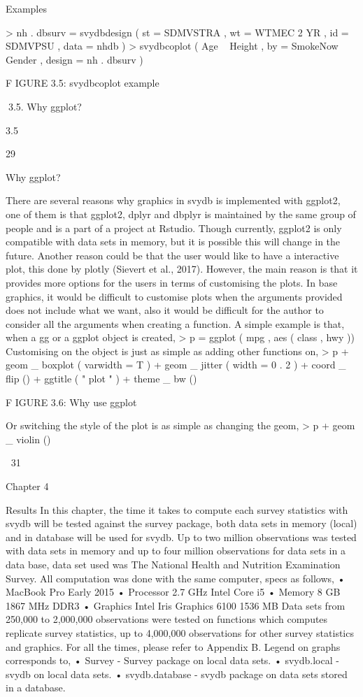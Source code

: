 Examples

> nh . dbsurv = svydbdesign ( st = SDMVSTRA , wt = WTMEC 2 YR ,
id = SDMVPSU , data = nhdb )
> svydbcoplot ( Age ~ Height , by = SmokeNow ~ Gender ,
design = nh . dbsurv )

F IGURE 3.5: svydbcoplot example

3.5. Why ggplot?

3.5

29

Why ggplot?

There are several reasons why graphics in svydb is implemented with ggplot2, one
of them is that ggplot2, dplyr and dbplyr is maintained by the same group of people
and is a part of a project at Rstudio. Though currently, ggplot2 is only compatible
with data sets in memory, but it is possible this will change in the future. Another
reason could be that the user would like to have a interactive plot, this done by
plotly (Sievert et al., 2017).
However, the main reason is that it provides more options for the users in terms
of customising the plots. In base graphics, it would be difficult to customise plots
when the arguments provided does not include what we want, also it would be difficult for the author to consider all the arguments when creating a function.
A simple example is that, when a gg or a ggplot object is created,
> p = ggplot ( mpg , aes ( class , hwy ))
Customising on the object is just as simple as adding other functions on,
> p + geom _ boxplot ( varwidth = T ) +
geom _ jitter ( width = 0 . 2 ) + coord _ flip () +
ggtitle ( " plot " ) + theme _ bw ()

F IGURE 3.6: Why use ggplot

Or switching the style of the plot is as simple as changing the geom,
> p + geom _ violin ()

31

Chapter 4

Results
In this chapter, the time it takes to compute each survey statistics with svydb will be
tested against the survey package, both data sets in memory (local) and in database
will be used for svydb. Up to two million observations was tested with data sets
in memory and up to four million observations for data sets in a data base, data set
used was The National Health and Nutrition Examination Survey.
All computation was done with the same computer, specs as follows,
• MacBook Pro Early 2015
• Processor 2.7 GHz Intel Core i5
• Memory 8 GB 1867 MHz DDR3
• Graphics Intel Iris Graphics 6100 1536 MB
Data sets from 250,000 to 2,000,000 observations were tested on functions which
computes replicate survey statistics, up to 4,000,000 observations for other survey
statistics and graphics. For all the times, please refer to Appendix B.
Legend on graphs corresponds to,
• Survey - Survey package on local data sets.
• svydb.local - svydb on local data sets.
• svydb.database - svydb package on data sets stored in a database.

